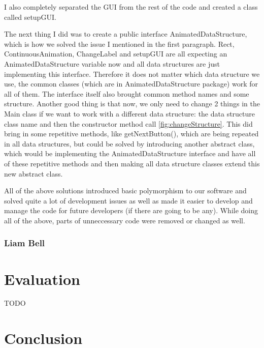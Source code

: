 \documentclass{l3proj}
\begin{document}
I also completely separated the GUI from the rest of the code and created a class called setupGUI.



The next thing I did was to create a public interface AnimatedDataStructure, which is how we solved the issue I mentioned in the first paragraph. Rect, ContinuousAnimation, ChangeLabel and setupGUI are all expecting an AnimatedDataStructure variable now and all data structures are just implementing this interface. Therefore it does not matter which data structure we use, the common classes (which are in AnimatedDataStructure package) work for all of them. The interface itself also brought common method names and some structure. Another good thing is that now, we only need to change 2 things in the Main class if we want to work with a different data structure: the data structure class name and then the constructor method call \ref{fig:changeStructure}. This did bring in some repetitive methods, like getNextButton(), which are being repeated in all data structures, but could be solved by introducing another abstract class, which would be implementing the AnimatedDataStructure interface and have all of these repetitive methods and then making all data structure classes extend this new abstract class.

All of the above solutions introduced basic polymorphism to our software and solved quite a lot of development issues as well as made it easier to develop and manage the code for future developers (if there are going to be any). While doing all of the above, parts of unneccessary code were removed or changed as well.

\subsection{Liam Bell}

\chapter{Evaluation}

TODO

\chapter{Conclusion}
\end{document}
